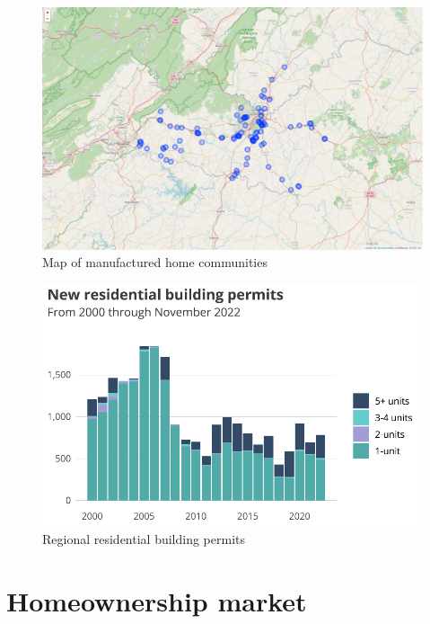 \documentclass[
  letterpaper,
  DIV=11,
  numbers=noendperiod]{scrreprt}
\begin{document}
\begin{figure}[H]

{\centering \includegraphics{./part-3-1_files/figure-pdf/fig-mhc-map-1.pdf}

}

\caption{\label{fig-mhc-map}Map of manufactured home communities}

\end{figure}

\begin{figure}[H]

{\centering \includegraphics{./part-3-1_files/figure-pdf/fig-permits-1.pdf}

}

\caption{\label{fig-permits}Regional residential building permits}

\end{figure}

\hypertarget{homeownership-market}{%
\section{Homeownership market}\label{homeownership-market}}
\end{document}
